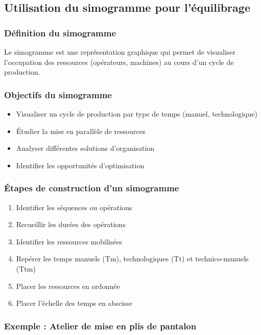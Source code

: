\documentclass[a4paper,12pt]{article}
\begin{document}
\subsection{Utilisation du simogramme pour l'équilibrage}

\subsubsection{Définition du simogramme}

Le simogramme est une représentation graphique qui permet de visualiser l'occupation des ressources (opérateurs, machines) au cours d'un cycle de production.

\subsubsection{Objectifs du simogramme}

\begin{itemize}
    \item Visualiser un cycle de production par type de temps (manuel, technologique)
    \item Étudier la mise en parallèle de ressources
    \item Analyser différentes solutions d'organisation
    \item Identifier les opportunités d'optimisation
\end{itemize}

\subsubsection{Étapes de construction d'un simogramme}

\begin{enumerate}
    \item Identifier les séquences ou opérations
    \item Recueillir les durées des opérations
    \item Identifier les ressources mobilisées
    \item Repérer les temps manuels (Tm), technologiques (Tt) et technico-manuels (Ttm)
    \item Placer les ressources en ordonnée
    \item Placer l'échelle des temps en abscisse
\end{enumerate}

\subsubsection{Exemple : Atelier de mise en plis de pantalon}
\end{document}
